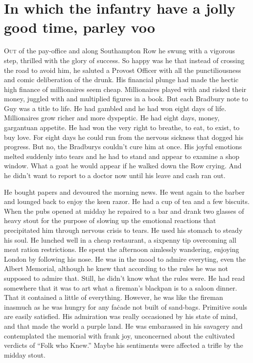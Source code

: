\chapter*{\textsf{In which the infantry have a jolly good time, parley voo}}

O\textsc{ut} of the pay-office and along Southampton Row he swung with a vigorous step, thrilled with the glory of success. So happy was he that instead of crossing the road to avoid him, he saluted a Provost Officer with all the punctiliousness and comic deliberation of the drunk. His financial plunge had made the hectic high finance of millionaires seem cheap. Millionaires played with and risked their money, juggled with and multiplied figures in a book. But each Bradbury note to Guy was a title to life. He had gambled and he had won eight days of life. Millionaires grow richer and more dyspeptic. He had eight days, money, gargantuan appetite. He had won the very right to breathe, to eat, to exist, to buy love. For eight days he could run from the nervous sickness that dogged his progress. But no, the Bradburys couldn't cure him at once. His joyful emotions melted suddenly into tears and he had to stand and appear to examine a shop window. What a goat he would appear if he walked down the Row crying. And he didn't want to report to a doctor now until his leave and cash ran out.

He bought papers and devoured the morning news. He went again to the barber and lounged back to enjoy the keen razor. He had a cup of tea and a few biscuits. When the pubs opened at midday he repaired to a bar and drank two glasses of heavy stout for the purpose of slowing up the emotional reactions that precipitated him through nervous crisis to tears. He used his stomach to steady his soul. He lunched well in a cheap restaurant, a sixpenny tip overcoming all meat ration restrictions. He spent the afternoon aimlessly wandering, enjoying London by following his nose. He was in the mood to admire everyting, even the Albert Memorial, although he knew that according to the rules he was not supposed to admire that. Still, he didn't know what the rules were. He had read somewhere that it was to art what a fireman's blackpan is to a saloon dinner. That it contained a little of everything. However, he was like the fireman inasmuch as he was hungry for any fa\.{c}ade not built of sand-bags. Primitive souls are easily satisfied. His admiration was really occasioned by his state of mind, and that made the world a purple land. He was embarassed in his savagery and contemplated the memorial with frank joy, unconcerned about the cultivated verdicts of ``Folk who Knew.'' Maybe his sentiments were affected a trifle by the midday stout.

